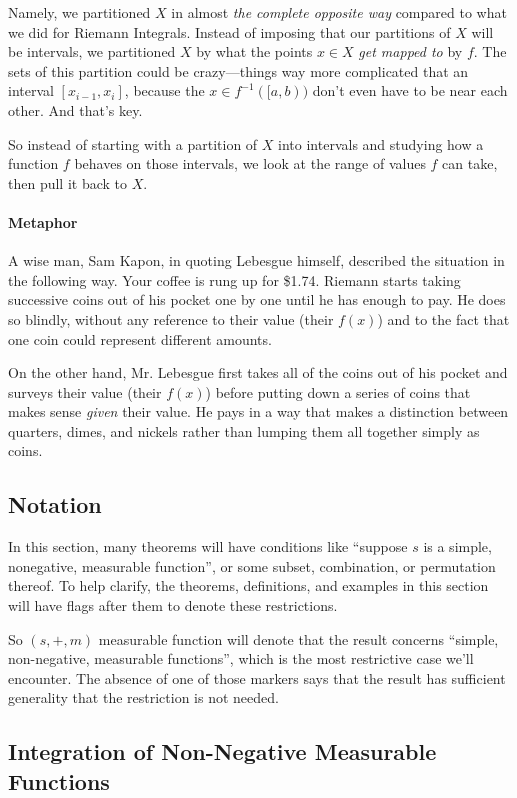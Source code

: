 \documentclass[12pt]{article}
\theoremstyle{plain}
\theoremstyle{definition}
\theoremstyle{remark}
\begin{document}
Namely, we partitioned $X$ in almost \emph{the complete opposite way} compared to what we did for Riemann Integrals. Instead of imposing that our partitions of $X$ will be intervals, we partitioned $X$ by what the points $x\in X$ \emph{get mapped to} by $f$. The sets of this partition could be crazy---things way more complicated that an interval $[x_{i-1}, x_i]$, because the $x\in f^{-1}([a,b))$ don't even have to be near each other. And that's key.

So instead of starting with a partition of $X$ into intervals and studying how a function $f$ behaves on those intervals, we look at the range of values $f$ can take, then pull it back to $X$.

\paragraph{Metaphor}
A wise man, Sam Kapon, in quoting Lebesgue himself, described the situation in the following way. Your coffee is rung up for \$1.74. Riemann starts taking successive coins out of his pocket one by one until he has enough to pay. He does so blindly, without any reference to their value (their $f(x)$) and to the fact that one coin could represent different amounts.

On the other hand, Mr. Lebesgue first takes all of the coins out of his pocket and surveys their value (their $f(x)$) before putting down a series of coins that makes sense \emph{given} their value. He pays in a way that makes a distinction between quarters, dimes, and nickels rather than lumping them all together simply as coins. 

\subsection{Notation}

In this section, many theorems will have conditions like ``suppose $s$ is a simple, nonegative, measurable function'', or some subset, combination, or permutation thereof. To help clarify, the theorems, definitions, and examples in this section will have flags after them to denote these restrictions. 

So $(s, +, m)$ measurable function will denote that the result concerns ``simple, non-negative, measurable functions'', which is the most restrictive case we'll encounter. The absence of one of those markers says that the result has sufficient generality that the restriction is not needed.

\subsection{Integration of Non-Negative Measurable Functions}
\end{document}
